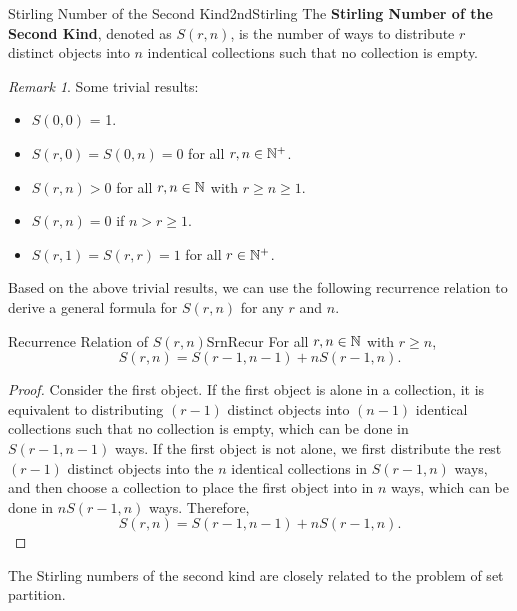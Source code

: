 \documentclass[math]{amznotes}
\theoremstyle{remark}
\newtheorem*{remark}{Remark}
\newcommand{\0}{\mathbf{0}}
\newcommand{\1}{\mathbf{1}}
\begin{document}
\begin{dfnbox}{Stirling Number of the Second Kind}{2ndStirling}
    The {\color{red} \textbf{Stirling Number of the Second Kind}}, denoted as $S(r, n)$, is the number of ways to distribute $r$ distinct objects into $n$ indentical collections such that no collection is empty.
\end{dfnbox}
\begin{notebox}
    \begin{remark}
        Some trivial results:
        \begin{itemize}
            \item $S(0, 0)$ = 1.
            \item $S(r, 0) = S(0, n) = 0$ for all $r, n \in \mathbb{N}^+$.
            \item $S(r, n) > 0$ for all $r, n \in \mathbb{N}$ with $r \geq n \geq 1$.
            \item $S(r, n) = 0$ if $n > r \geq 1$.
            \item $S(r, 1) = S(r, r) = 1$ for all $r \in \mathbb{N}^+$.
        \end{itemize}
    \end{remark}
\end{notebox}
Based on the above trivial results, we can use the following recurrence relation to derive a general formula for $S(r, n)$ for any $r$ and $n$.
\begin{thmbox}{Recurrence Relation of $S(r, n)$}{SrnRecur}
    For all $r, n \in \mathbb{N}$ with $r \geq n$,
    \begin{equation*}
        S(r, n) = S(r - 1, n - 1) + nS(r - 1, n).
    \end{equation*}
    \tcblower
    \begin{proof}
        Consider the first object. If the first object is alone in a collection, it is equivalent to distributing $(r - 1)$ distinct objects into $(n - 1)$ identical collections such that no collection is empty, which can be done in $S(r - 1, n - 1)$ ways. If the first object is not alone, we first distribute the rest $(r - 1)$ distinct objects into the $n$ identical collections in $S(r - 1, n)$ ways, and then choose a collection to place the first object into in $n$ ways, which can be done in $nS(r - 1, n)$ ways. Therefore, 
        \begin{equation*}
            S(r, n) = S(r - 1, n - 1) + nS(r - 1, n).
        \end{equation*}
    \end{proof}
\end{thmbox}
The Stirling numbers of the second kind are closely related to the problem of set partition.
\end{document}
